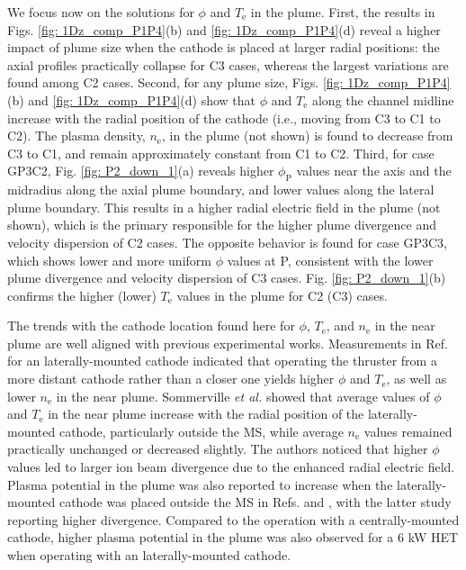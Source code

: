 \documentclass[%
 aip,
cha,
 amsmath,amssymb,
 reprint,%
]{revtex4-1}
\begin{document}
We focus now on the solutions for $\phi$ and $T_\mathrm{e}$ in the plume.
%
First, the results in Figs. \ref{fig: 1Dz_comp_P1P4}(b) and \ref{fig: 1Dz_comp_P1P4}(d) reveal a higher impact of plume size when the cathode is placed at larger radial positions: the axial profiles practically collapse for C3 cases, whereas the largest variations are found among C2 cases.
%
Second, for any plume size, Figs. \ref{fig: 1Dz_comp_P1P4}(b) and \ref{fig: 1Dz_comp_P1P4}(d) show that $\phi$ and $T_\mathrm{e}$ along the channel midline increase with the radial position of the cathode (i.e., moving from C3 to C1 to C2). The plasma density, $n_\mathrm{e}$, in the plume (not shown) is found to decrease from C3 to C1, and remain approximately constant from C1 to C2.
%
Third, for case GP3C2, Fig. \ref{fig: P2_down_1}(a) reveals higher $\phi_\mathrm{P}$ values near the axis and the midradius along the axial plume boundary, and lower values along the lateral plume boundary. This results in a higher radial electric field in the plume (not shown), which is the primary responsible for the higher plume divergence and velocity dispersion of C2 cases. The opposite behavior is found for case GP3C3, which shows lower and more uniform $\phi$ values at P, consistent with the lower plume divergence and velocity dispersion of C3 cases.
%
Fig. \ref{fig: P2_down_1}(b) confirms the higher (lower) $T_\mathrm{e}$ values in the plume for C2 (C3) cases.


The trends with the cathode location found here for $\phi$, $T_\mathrm{e}$, and $n_\mathrm{e}$ in the near plume are well aligned with previous experimental works. Measurements in Ref.  for an laterally-mounted cathode indicated that operating the thruster from a more distant cathode rather than a closer one yields higher $\phi$ and $T_\mathrm{e}$, as well as lower $n_\mathrm{e}$ in the near plume. Sommerville \textit{et al.} \cite{somm11b} showed that average values of $\phi$ and $T_\mathrm{e}$ in the near plume increase with the radial position of the laterally-mounted cathode, particularly outside the MS, while average $n_\mathrm{e}$ values remained practically unchanged or decreased slightly. The authors noticed that higher $\phi$ values led to larger ion beam divergence due to the enhanced radial electric field.
%
Plasma potential in the plume was also reported to increase when the laterally-mounted cathode was placed outside the MS in Refs.  and , with the latter study reporting higher divergence.
%
Compared to the operation with a centrally-mounted cathode, higher plasma potential in the plume was also observed for a 6 kW HET \cite{jame07} when operating with an laterally-mounted cathode. 
\end{document}
